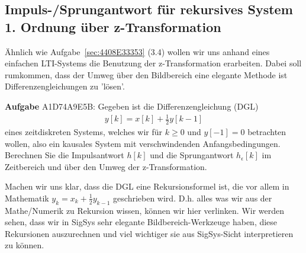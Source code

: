 \subsection{Impuls-/Sprungantwort für rekursives System 1. Ordnung über z-Transformation}
\label{sec:A1D74A9E5B}
\begin{Ziel}
Ähnlich wie Aufgabe~\ref{sec:4408E33353} (3.4) wollen wir uns anhand eines einfachen LTI-Systems
die Benutzung der z-Transformation erarbeiten. Dabei soll rumkommen, dass
der Umweg über den Bildbereich eine elegante Methode ist Differenzengleichungen
zu 'lösen'.
\end{Ziel}
\textbf{Aufgabe} {\tiny A1D74A9E5B}: Gegeben ist die Differenzengleichung (DGL)
\begin{align}
y[k] = x[k] + \frac{1}{2} y[k-1]
\end{align}
eines zeitdiskreten Systems, welches wir für $k \geq 0$ und $y[-1]=0$ betrachten
wollen, also ein kausales System mit verschwindenden Anfangsbedingungen.
Berechnen Sie die Impulsantwort $h[k]$ und die Sprungantwort $h_\epsilon[k]$
im Zeitbereich und über den Umweg der z-Transformation.
\begin{Werkzeug}
Machen wir uns klar, dass die DGL eine Rekursionsformel ist, die vor allem
in Mathematik $y_k = x_k + \frac{1}{2} y_{k-1}$ geschrieben wird. D.h. alles
was wir aus der Mathe/Numerik zu Rekursion wissen, können wir hier verlinken.
Wir werden sehen, dass wir in SigSys sehr elegante Bildbereich-Werkzeuge haben,
diese Rekursionen auszurechnen und viel wichtiger sie aus SigSys-Sicht
interpretieren zu können.
\end{Werkzeug}
